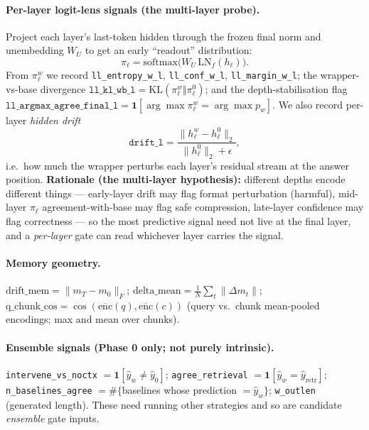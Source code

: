 \documentclass[11pt]{article}
\newcommand{\code}[1]{\texttt{#1}}
\begin{document}
\paragraph{Per-layer logit-lens signals (the multi-layer probe).} Project
each layer's last-token hidden through the frozen final norm and
unembedding $W_U$ to get an early ``readout'' distribution:
\begin{equation}
\pi_\ell = \mathrm{softmax}\!\big(W_U\,\mathrm{LN}_f(h_\ell)\big).
\end{equation}
From $\pi_\ell^{w}$ we record \code{ll\_entropy\_w\_l}, \code{ll\_conf\_w\_l},
\code{ll\_margin\_w\_l}; the wrapper-vs-base divergence
$\mathrm{\code{ll\_kl\_wb\_l}}=\mathrm{KL}(\pi_\ell^{w}\Vert\pi_\ell^{0})$;
and the depth-stabilisation flag
$\mathrm{\code{ll\_argmax\_agree\_final\_l}}=\mathbf{1}[\arg\max\pi_\ell^{w}
=\arg\max p_w]$. We also record per-layer \emph{hidden drift}
\begin{equation}
\mathrm{\code{drift\_l}} =
\frac{\lVert h_\ell^{w}-h_\ell^{0}\rVert_2}{\lVert h_\ell^{0}\rVert_2+\epsilon},
\end{equation}
i.e.\ how much the wrapper perturbs each layer's residual stream at the
answer position. \textbf{Rationale (the multi-layer hypothesis):}
different depths encode different things --- early-layer drift may flag
format perturbation (harmful), mid-layer $\pi_\ell$ agreement-with-base
may flag safe compression, late-layer confidence may flag correctness ---
so the most predictive signal need not live at the final layer, and a
\emph{per-layer} gate can read whichever layer carries the signal.

\paragraph{Memory geometry.} $\mathrm{drift\_mem}=\lVert m_T-m_0\rVert_F$;
$\mathrm{delta\_mean}=\tfrac1N\sum_t\lVert\Delta m_t\rVert$;
$\mathrm{q\_chunk\_cos}=\cos(\overline{\mathrm{enc}}(q),\overline{\mathrm{enc}}(c))$
(query vs.\ chunk mean-pooled encodings; max and mean over chunks).

\paragraph{Ensemble signals (Phase 0 only; not purely intrinsic).}
\code{intervene\_vs\_noctx} $=\mathbf{1}[\hat y_w\ne\hat y_0]$;
\code{agree\_retrieval} $=\mathbf{1}[\hat y_w=\hat y_{\mathrm{retr}}]$;
\code{n\_baselines\_agree} $=\#\{$baselines whose prediction $=\hat y_w\}$;
\code{w\_outlen} (generated length). These need running other strategies
and so are candidate \emph{ensemble} gate inputs.
\end{document}

